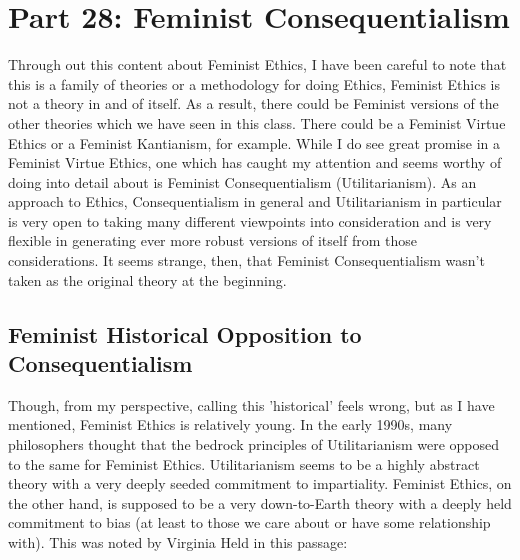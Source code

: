 \chapter{Part 28: Feminist Consequentialism}

Through out this content about Feminist Ethics, I have been careful to note that this is a family of theories or a methodology for doing Ethics, Feminist Ethics is not a theory in and of itself. As a result, there could be Feminist versions of the other theories which we have seen in this class. There could be a Feminist Virtue Ethics or a Feminist Kantianism, for example. While I do see great promise in a Feminist Virtue Ethics, one which has caught my attention and seems worthy of doing into detail about is Feminist Consequentialism (Utilitarianism).\autocite{Driver2} As an approach to Ethics, Consequentialism in general and Utilitarianism in particular is very open to taking many different viewpoints into consideration and is very flexible in generating ever more robust versions of itself from those considerations. It seems strange, then, that Feminist Consequentialism wasn't taken as the original theory at the beginning.
\section{Feminist Historical Opposition to Consequentialism}

Though, from my perspective, calling this 'historical' feels wrong, but as I have mentioned, Feminist Ethics is relatively young. In the early 1990s, many philosophers thought that the bedrock principles of Utilitarianism were opposed to the same for Feminist Ethics. Utilitarianism seems to be a highly abstract theory with a very deeply seeded commitment to impartiality. Feminist Ethics, on the other hand, is supposed to be a very down-to-Earth theory with a deeply held commitment to bias (at least to those we care about or have some relationship with). This was noted by Virginia Held in this passage:\autocite{Held1}


